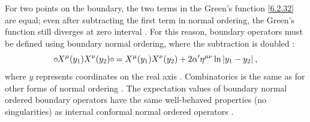 For two points on the boundary, the two terms in the Green's function \eqref{6.2.32} are equal; even after subtracting the first term in normal ordering, the Green's function still diverges at zero interval . For this reason, boundary operators must be defined using boundary normal ordering, where the subtraction is doubled :
\begin{equation}
	\circ\mkern-1mu X^{\mu}(y_{1}) X^{\nu}(y_{2})\circ\mkern-1mu = X^{\mu}(y_{1}) X^{\nu}(y_{2})+2 \alpha^{\prime} \eta^{\mu \nu} 
	\ln |y_{1}-y_{2}| \:,  \label{6.2.34}
\end{equation}
where $y$ represents coordinates on the real axis . Combinatorics is the same as for other forms of normal ordering . The expectation values of boundary normal ordered boundary operators have the same well-behaved properties (no singularities) as internal conformal normal ordered operators .
